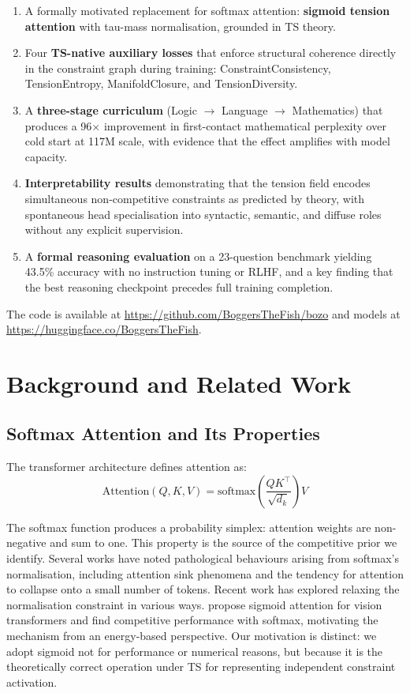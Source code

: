 \documentclass[10pt,a4paper]{article}
\begin{document}
\begin{enumerate}[label=(\arabic*)]
    \item A formally motivated replacement for softmax attention: \textbf{sigmoid tension attention} with tau-mass normalisation, grounded in TS theory.
    \item Four \textbf{TS-native auxiliary losses} that enforce structural coherence directly in the constraint graph during training: ConstraintConsistency, TensionEntropy, ManifoldClosure, and TensionDiversity.
    \item A \textbf{three-stage curriculum} (Logic $\rightarrow$ Language $\rightarrow$ Mathematics) that produces a 96$\times$ improvement in first-contact mathematical perplexity over cold start at 117M scale, with evidence that the effect amplifies with model capacity.
    \item \textbf{Interpretability results} demonstrating that the tension field encodes simultaneous non-competitive constraints as predicted by theory, with spontaneous head specialisation into syntactic, semantic, and diffuse roles without any explicit supervision.
    \item A \textbf{formal reasoning evaluation} on a 23-question benchmark yielding 43.5\% accuracy with no instruction tuning or RLHF, and a key finding that the best reasoning checkpoint precedes full training completion.
\end{enumerate}

The code is available at \url{https://github.com/BoggersTheFish/bozo} and models at \url{https://huggingface.co/BoggersTheFish}.

\section{Background and Related Work}

\subsection{Softmax Attention and Its Properties}

The transformer architecture \cite{vaswani2017attention} defines attention as:
\begin{equation}
    \text{Attention}(Q, K, V) = \text{softmax}\!\left(\frac{QK^\top}{\sqrt{d_k}}\right) V
\end{equation}

The softmax function produces a probability simplex: attention weights are non-negative and sum to one. This property is the source of the competitive prior we identify. Several works have noted pathological behaviours arising from softmax's normalisation, including attention sink phenomena \cite{xiao2023efficient} and the tendency for attention to collapse onto a small number of tokens. Recent work has explored relaxing the normalisation constraint in various ways. \citet{ramapuram2024sigmoid} propose sigmoid attention for vision transformers and find competitive performance with softmax, motivating the mechanism from an energy-based perspective. Our motivation is distinct: we adopt sigmoid not for performance or numerical reasons, but because it is the theoretically correct operation under TS for representing independent constraint activation.
\end{document}
